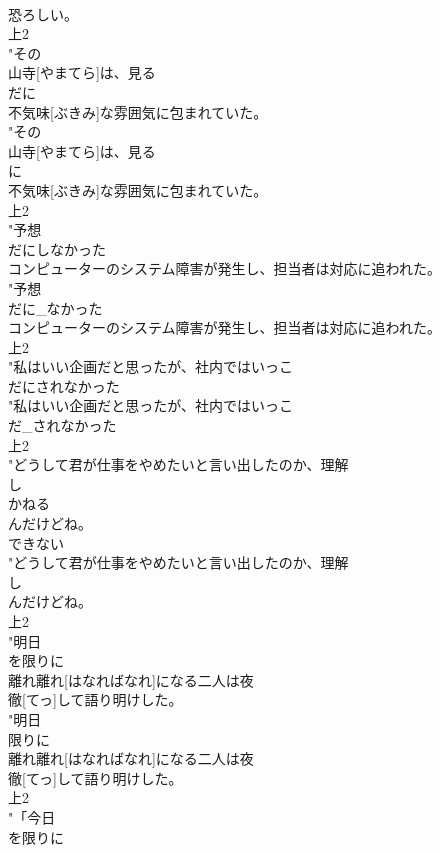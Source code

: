 \documentclass[8pt]{extreport}
\begin{document}
\begin{CJK}{UTF8}{min}
\\	恐ろしい。
\\	上2
\\	"その
\\	山寺[やまてら]は、見る
\\	だに
\\	不気味[ぶきみ]な雰囲気に包まれていた。
\\	"その
\\	山寺[やまてら]は、見る
\\	に
\\	不気味[ぶきみ]な雰囲気に包まれていた。
\\	上2
\\	"予想
\\	だにしなかった
\\	コンピューターのシステム障害が発生し、担当者は対応に追われた。
\\	"予想
\\	だに_なかった
\\	コンピューターのシステム障害が発生し、担当者は対応に追われた。
\\	上2
\\	"私はいい企画だと思ったが、社内ではいっこ
\\	だにされなかった
\\	"私はいい企画だと思ったが、社内ではいっこ
\\	だ_されなかった
\\	上2
\\	"どうして君が仕事をやめたいと言い出したのか、理解
\\	し
\\	かねる
\\	んだけどね。
\\	できない 
\\	"どうして君が仕事をやめたいと言い出したのか、理解
\\	し
\\	んだけどね。
\\	上2
\\	"明日
\\	を限りに
\\	離れ離れ[はなればなれ]になる二人は夜
\\	徹[てっ]して語り明けした。
\\	"明日
\\	限りに
\\	離れ離れ[はなればなれ]になる二人は夜
\\	徹[てっ]して語り明けした。
\\	上2
\\	"「今日
\\	を限りに

\end{CJK}
\end{document}
